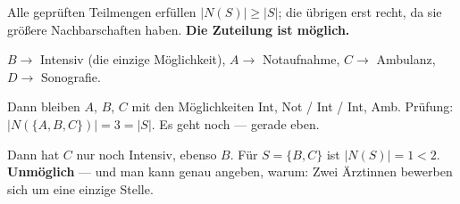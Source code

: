 \begin{merksatz}
Alle geprüften Teilmengen erfüllen $|N(S)| \ge |S|$; die übrigen erst recht, da sie größere Nachbarschaften haben. \textbf{Die Zuteilung ist möglich.}

$B \to$ Intensiv (die einzige Möglichkeit), $A \to$ Notaufnahme, $C \to$ Ambulanz, $D \to$ Sonografie.

Dann bleiben $A$, $B$, $C$ mit den Möglichkeiten Int, Not / Int / Int, Amb. Prüfung: $|N(\{A,B,C\})| = 3 = |S|$. Es geht noch --- gerade eben.

Dann hat $C$ nur noch Intensiv, ebenso $B$. Für $S = \{B,C\}$ ist $|N(S)| = 1 < 2$. \textbf{Unmöglich} --- und man kann genau angeben, warum: Zwei Ärztinnen bewerben sich um eine einzige Stelle.

\begin{center}
\begin{minipage}{0.88\textwidth}
\end{minipage}
\end{center}
\end{merksatz}

